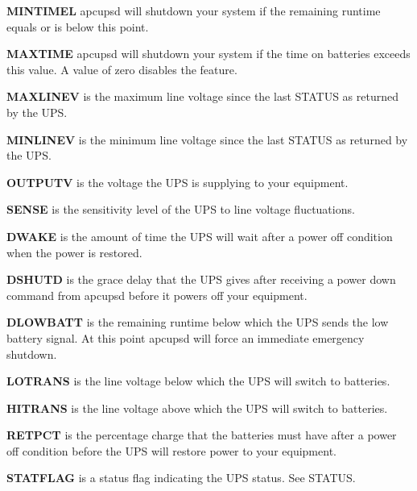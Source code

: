 {{{{{{{{{{{{{{{\begin{description}
\item {\bf MINTIMEL}
apcupsd will shutdown your system if the remaining runtime equals or is below
this point.  

\item {\bf MAXTIME}
apcupsd will shutdown your system if the time on batteries exceeds this value.
A value of zero disables the feature.  

\item {\bf MAXLINEV}
is the maximum line voltage since the last STATUS as returned by the UPS.  

\item {\bf MINLINEV}
is the minimum line voltage since the last STATUS as returned by the UPS.  

\item {\bf OUTPUTV}
is the voltage the UPS is supplying to your equipment.  

\item {\bf SENSE}
is the sensitivity level of the UPS to line voltage fluctuations.  

\item {\bf DWAKE}
is the amount of time the UPS will wait after a power off condition when the
power is restored.  

\item {\bf DSHUTD}
is the grace delay that the UPS gives after receiving a power down command
from apcupsd before it powers off your equipment.  

\item {\bf DLOWBATT}
is the remaining runtime below which the UPS sends the low battery signal. At
this point apcupsd will force an immediate emergency shutdown.  

\item {\bf LOTRANS}
is the line voltage below which the UPS will switch to batteries.  

\item {\bf HITRANS}
is the line voltage above which the UPS will switch to batteries.  

\item {\bf RETPCT}
is the percentage charge that the batteries must have after a power off
condition before the UPS will restore power to your equipment.  

\item {\bf STATFLAG}
is a status flag indicating the UPS status. See STATUS.  


\end{description}}}}}}}}}}}}}}}}
